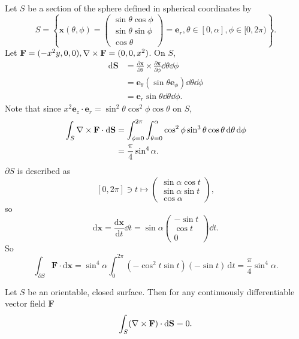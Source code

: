 \begin{example}
    Let $S$ be a section of the sphere defined in spherical coordinates by
    \[
        S = \left\{ \mathbf{x}(\theta,\phi) = \begin{pmatrix}
            \sin \theta \cos \phi \\ \sin \theta \sin \phi \\ \cos \theta 
        \end{pmatrix}=\mathbf{e}_r, \theta\in [0,\alpha],\phi\in [0,2\pi) \right\}.
    \]
    Let $ \mathbf{F} = (-x^2y,0,0), \nabla\times\mathbf{F} = (0,0,x^2) $. On $S$,
    \begin{align*}
        \mathrm{d} \mathbf{S} &= \frac{\partial \mathbf{x}}{\partial \theta} \times \frac{\partial \mathbf{x}}{\partial \phi}\dd \theta\dd \phi \\
        &= \mathbf{e}_\theta\left( \sin \theta \mathbf{e}_\phi \right) \dd \theta\dd \phi\\ 
        &= \mathbf{e}_r \sin \theta \dd \theta\dd \phi.
    \end{align*}
    Note that since $ x^2\mathbf{e}_z \cdot \mathbf{e}_r = \sin^2 \theta \cos^2 \phi \cos \theta $ on $S$, 
    \begin{align*}
        \int_{S} \nabla\times\mathbf{F} \cdot\mathrm{d}\mathbf{S} &= \int_{\phi=0}^{2\pi} \int_{\theta=0}^{\alpha} \cos^2 \phi \sin^3 \theta \cos \theta \,\mathrm{d}\theta \,\mathrm{d}\phi\\ 
        &= \frac{\pi}{4}\sin^4 \alpha.
    \end{align*}
    $ \partial S $ is described as
    \[
        [0,2\pi] \ni t \mapsto \begin{pmatrix}
            \sin \alpha \cos t \\ \sin \alpha \sin t \\ \cos \alpha
        \end{pmatrix},
    \]
    so 
    \[
        \mathrm{d} \mathbf{x} = \frac{\mathrm{d}\mathbf{x}}{\mathrm{d}t}\dd t = \sin \alpha \begin{pmatrix}
            -\sin t \\ \cos t \\ 0
        \end{pmatrix}\dd t. 
    \]
    So 
    \[
        \int_{\partial S} \mathbf{F} \cdot\mathrm{d}\mathbf{x} = \sin^4 \alpha \int_{0}^{2\pi} (-\cos^2 t \sin t)(-\sin t) \,\mathrm{d}t=\frac{\pi}{4}\sin^4 \alpha.
    \]
\end{example}
\begin{example}
    Let $S$ be an orientable, closed surface. Then for any continuously differentiable vector field $\mathbf{F}$
    \[
        \int_{S} (\nabla\times \mathbf{F}) \cdot\mathrm{d}\mathbf{S}=0.
    \]
\end{example}
